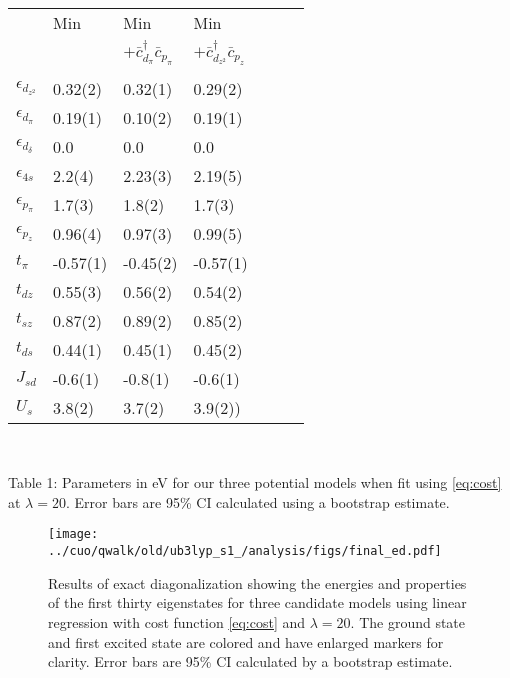 \documentclass[12pt]{article}
\begin{document}
\begin{table}[H]
\begin{center}
\begin{tabular}{l|llllll}
&Min & Min & Min \\
& & $ + \bar{c}_{d_\pi}^\dagger \bar{c}_{p_\pi}$ & $ + \bar{c}_{d_{z^2}}^\dagger \bar{c}_{p_z}$ \\ $\ $ \\ \hline 
$\epsilon_{d_{z^2}}$& 0.32(2)& 0.32(1)& 0.29(2)\\
$\epsilon_{d_\pi}$& 0.19(1)& 0.10(2)& 0.19(1)\\
$\epsilon_{d_\delta}$& 0.0 & 0.0 & 0.0\\
$\epsilon_{4s}$& 2.2(4)& 2.23(3)& 2.19(5)\\
$\epsilon_{p_\pi}$& 1.7(3)& 1.8(2)& 1.7(3)\\
$\epsilon_{p_z}$& 0.96(4)& 0.97(3)& 0.99(5)\\
$t_\pi$& -0.57(1)& -0.45(2)& -0.57(1)\\
$t_{dz}$& 0.55(3)& 0.56(2)& 0.54(2)\\
$t_{sz}$& 0.87(2)& 0.89(2)& 0.85(2)\\
$t_{ds}$& 0.44(1)& 0.45(1)& 0.45(2)\\
$J_{sd}$& -0.6(1)& -0.8(1)& -0.6(1)\\
$U_s$& 3.8(2)& 3.7(2)& 3.9(2))\\
\end{tabular}
\\ $\ $
\\
\end{center}
Table 1: Parameters in eV for our three potential models when fit using \eqref{eq:cost} at $\lambda = 20$. Error bars are 95\% CI calculated using a bootstrap estimate.
\end{table}

\begin{figure}[H]
\centering
\texttt{[image: ../cuo/qwalk/old/ub3lyp\_s1\_/analysis/figs/final\_ed.pdf]}
\caption{Results of exact diagonalization showing the energies and properties of the first thirty eigenstates for three candidate models using linear regression with cost function \ref{eq:cost} and $\lambda = 20$. The ground state and first excited state are colored and have enlarged markers for clarity. Error bars are 95\% CI calculated by a bootstrap estimate.}
\label{fig:FinalED}
\end{figure}	
\end{document}
